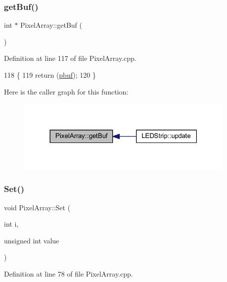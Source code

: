 \subsubsection{\texorpdfstring{get\+Buf()}{getBuf()}}
{\footnotesize\ttfamily int $\ast$ Pixel\+Array\+::get\+Buf (\begin{DoxyParamCaption}{ }\end{DoxyParamCaption})}



Definition at line 117 of file Pixel\+Array.\+cpp.


\begin{DoxyCode}
118 \{
119     \textcolor{keywordflow}{return} (\hyperlink{class_pixel_array_ab0109a336e69a9942b2723e43ee715d7}{pbuf});
120 \}
\end{DoxyCode}
Here is the caller graph for this function\+:\nopagebreak
\begin{figure}[H]
\begin{center}
\leavevmode
\includegraphics[width=302pt]{class_pixel_array_a987f1dc053a5cf25d78d5cfe037088d3_icgraph}
\end{center}
\end{figure}
\mbox{\label{class_pixel_array_afcfe32b74beeced27f928f42131d77c1}} 
\subsubsection{\texorpdfstring{Set()}{Set()}}
{\footnotesize\ttfamily void Pixel\+Array\+::\+Set (\begin{DoxyParamCaption}\item[{int}]{i,  }\item[{unsigned int}]{value }\end{DoxyParamCaption})}



Definition at line 78 of file Pixel\+Array.\+cpp.


